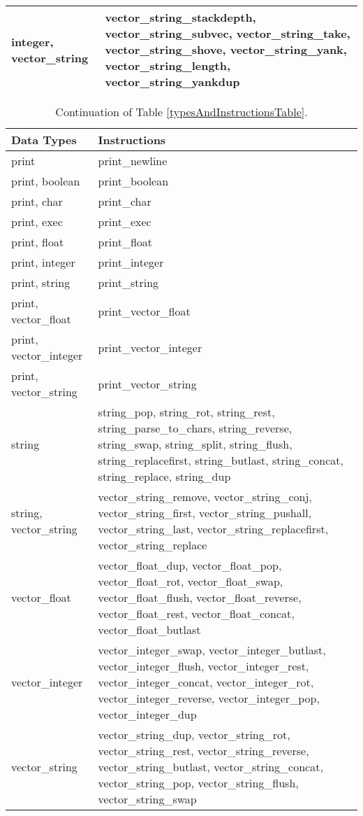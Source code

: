 \documentclass{sig-alternate}
\begin{document}
\begin{table*}
\begin{tabular}{>{\raggedright}p{4cm} >{\raggedright}p{13cm}}
integer, vector\_string & vector\_string\_stackdepth, vector\_string\_subvec, vector\_string\_take, vector\_string\_shove, vector\_string\_yank, vector\_string\_length, vector\_string\_yankdup \tabularnewline
\bottomrule
\end{tabular}
\end{table*}

\begin{table*}[t]
\centering
\caption{Continuation of Table \ref{typesAndInstructionsTable}.}
\label{typesAndInstructionsTable2}
\begin{tabular}{>{\raggedright}p{3cm} >{\raggedright}p{14cm}}
\toprule
\textbf{Data Types} & \textbf{Instructions} \tabularnewline
\midrule
print & print\_newline \tabularnewline
print, boolean & print\_boolean \tabularnewline
print, char & print\_char \tabularnewline
print, exec & print\_exec \tabularnewline
print, float & print\_float \tabularnewline
print, integer & print\_integer \tabularnewline
print, string & print\_string \tabularnewline
print, vector\_float & print\_vector\_float \tabularnewline
print, vector\_integer & print\_vector\_integer \tabularnewline
print, vector\_string & print\_vector\_string \tabularnewline
string & string\_pop, string\_rot, string\_rest, string\_parse\_to\_chars, string\_reverse, string\_swap, string\_split, string\_flush, string\_replacefirst, string\_butlast, string\_concat, string\_replace, string\_dup \tabularnewline
string, vector\_string & vector\_string\_remove, vector\_string\_conj, vector\_string\_first, vector\_string\_pushall, vector\_string\_last, vector\_string\_replacefirst, vector\_string\_replace \tabularnewline
vector\_float & vector\_float\_dup, vector\_float\_pop, vector\_float\_rot, vector\_float\_swap, vector\_float\_flush, vector\_float\_reverse, vector\_float\_rest, vector\_float\_concat, vector\_float\_butlast \tabularnewline
vector\_integer & vector\_integer\_swap, vector\_integer\_butlast, vector\_integer\_flush, vector\_integer\_rest, vector\_integer\_concat, vector\_integer\_rot, vector\_integer\_reverse, vector\_integer\_pop, vector\_integer\_dup \tabularnewline
vector\_string & vector\_string\_dup, vector\_string\_rot, vector\_string\_rest, vector\_string\_reverse, vector\_string\_butlast, vector\_string\_concat, vector\_string\_pop, vector\_string\_flush, vector\_string\_swap \tabularnewline
\bottomrule
\end{tabular}
\end{table*}
\end{document}
